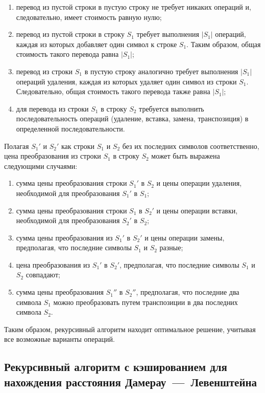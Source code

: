 \begin{enumerate}[label=\arabic*)]
	\item перевод из пустой строки в пустую строку не требует никаких операций и, следовательно, имеет стоимость равную нулю;
	\item перевод из пустой строки в строку $S_{1}$ требует выполнения $|S_{1}|$ операций, каждая из которых добавляет один символ к строке $S_{1}$. Таким образом, общая стоимость такого перевода равна $|S_{1}|$;
	\item перевод из строки $S_{1}$ в пустую строку аналогично требует выполнения $|S_{1}|$ операций удаления, каждая из которых удаляет один символ из строки $S_{1}$. Следовательно, общая стоимость такого перевода также равна $|S_{1}|$;
	\item для перевода из строки $S_{1}$ в строку $S_{2}$ требуется выполнить последовательность операций (удаление, вставка, замена, транспозиция) в определенной последовательности.
\end{enumerate}

Полагая $S_{1}'$ и $S_{2}'$ как строки $S_{1}$ и $S_{2}$ без их последних символов соответственно, цена преобразования из строки $S_{1}$ в строку $S_{2}$ может быть выражена следующими случаями:
\begin{enumerate}
   \item сумма цены преобразования строки $S_{1}'$ в $S_{2}$ и цены операции удаления, необходимой для преобразования $S_{1}'$ в $S_{1}$;
   \item сумма цены преобразования строки $S_{1}$ в $S_{2}'$ и цены операции вставки, необходимой для преобразования $S_{2}'$ в $S_{2}$;
   \item сумма цены преобразования из $S_{1}'$ в $S_{2}'$ и цены операции замены, предполагая, что последние символы $S_{1}$ и $S_{2}$ разные;
   \item цена преобразования из $S_{1}'$ в $S_{2}'$, предполагая, что последние символы $S_{1}$ и $S_{2}$ совпадают;
   \item сумма цены преобразования $S_{1}''$ в $S_{2}''$, предполагая, что последние два символа $S_{1}$ можно преобразовать путем транспозиции в два последних символа $S_{2}$.
\end{enumerate}

Таким образом, рекурсивный алгоритм находит оптимальное решение, учитывая все возможные варианты операций.

\subsection{Рекурсивный алгоритм с кэшированием для нахождения расстояния Дамерау~---~Левенштейна}

